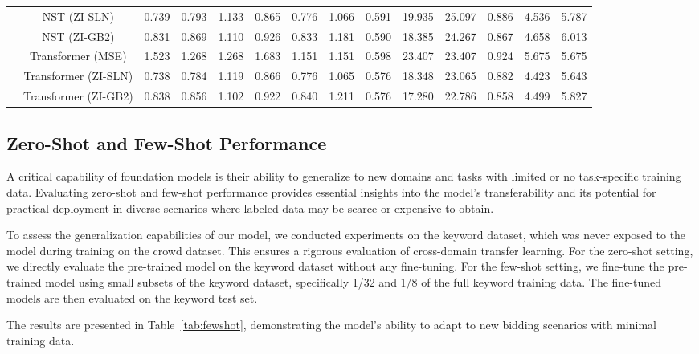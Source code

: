\begin{table}[htbp]
{\begin{tabular}{lccccccccccccc}
 & NST (ZI-SLN) & 0.739 & 0.793 & 1.133 & 0.865 & 0.776 & 1.066 & 0.591 & 19.935 & 25.097 & 0.886 & 4.536 & 5.787 \\
 & NST (ZI-GB2) & 0.831 & 0.869 & 1.110 & 0.926 & 0.833 & 1.181 & 0.590 & 18.385 & 24.267 & 0.867 & 4.658 & 6.013 \\
 & Transformer (MSE) & 1.523 & 1.268 & 1.268 & 1.683 & 1.151 & 1.151 & 0.598 & 23.407 & 23.407 & 0.924 & 5.675 & 5.675 \\
 & Transformer (ZI-SLN) & 0.738 & 0.784 & 1.119 & 0.866 & 0.776 & 1.065 & 0.576 & 18.348 & 23.065 & 0.882 & 4.423 & 5.643 \\
 & Transformer (ZI-GB2) & 0.838 & 0.856 & 1.102 & 0.922 & 0.840 & 1.211 & 0.576 & 17.280 & 22.786 & 0.858 & 4.499 & 5.827 \\
\bottomrule
\end{tabular}
}
\end{table}

\subsection{Zero-Shot and Few-Shot Performance}
\label{subsec:zeroshot_fewshot}

A critical capability of foundation models is their ability to generalize to new domains and tasks with limited or no task-specific training data. Evaluating zero-shot and few-shot performance provides essential insights into the model's transferability and its potential for practical deployment in diverse scenarios where labeled data may be scarce or expensive to obtain.

To assess the generalization capabilities of our model, we conducted experiments on the keyword dataset, which was never exposed to the model during training on the crowd dataset. This ensures a rigorous evaluation of cross-domain transfer learning. For the zero-shot setting, we directly evaluate the pre-trained model on the keyword dataset without any fine-tuning. For the few-shot setting, we fine-tune the pre-trained model using small subsets of the keyword dataset, specifically 1/32 and 1/8 of the full keyword training data. The fine-tuned models are then evaluated on the keyword test set.

The results are presented in Table~\ref{tab:fewshot}, demonstrating the model's ability to adapt to new bidding scenarios with minimal training data.

